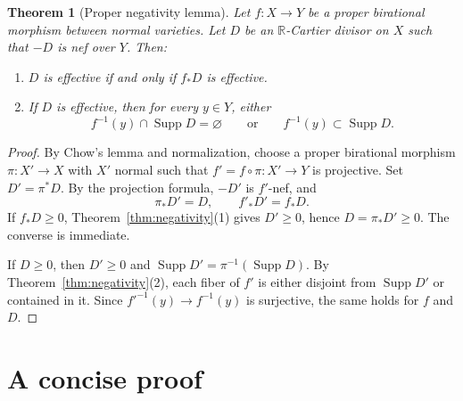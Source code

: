 \documentclass[12pt,a4paper,psamsfonts]{amsart}
\theoremstyle{plain}
\newtheorem{theorem}{Theorem}[section]
\theoremstyle{definition}
\newcommand{\R}{\mathbb R}
\DeclareMathOperator{\Supp}{Supp}
\begin{document}
\begin{theorem}[Proper negativity lemma]\label{thm:proper-negativity}
Let $f\colon X\to Y$ be a proper birational morphism between normal
varieties. Let $D$ be an $\R$-Cartier divisor on $X$ such that $-D$ is
nef over $Y$. Then:
\begin{enumerate}
\item $D$ is effective if and only if $f_*D$ is effective.
\item If $D$ is effective, then for every $y\in Y$, either
\[
f^{-1}(y)\cap\Supp D=\varnothing
\qquad\text{or}\qquad
f^{-1}(y)\subset\Supp D.
\]
\end{enumerate}
\end{theorem}

\begin{proof}
By Chow's lemma and normalization, choose a proper birational
morphism $\pi\colon X'\to X$ with $X'$ normal such that
$f'=f\circ\pi\colon X'\to Y$ is projective. Set $D'=\pi^*D$.
By the projection formula, $-D'$ is $f'$-nef, and
\[
\pi_*D'=D,\qquad f'_*D'=f_*D.
\]
If $f_*D\geq0$, Theorem~\ref{thm:negativity}\textup{(1)} gives
$D'\geq0$, hence $D=\pi_*D'\geq0$. The converse is immediate.

If $D\geq0$, then $D'\geq0$ and
$\Supp D'=\pi^{-1}(\Supp D)$. By
Theorem~\ref{thm:negativity}\textup{(2)}, each fiber of $f'$ is
either disjoint from $\Supp D'$ or contained in it. Since
$f'^{-1}(y)\to f^{-1}(y)$ is surjective, the same holds for $f$
and $D$.
\end{proof}

\section{A concise proof}
\end{document}
